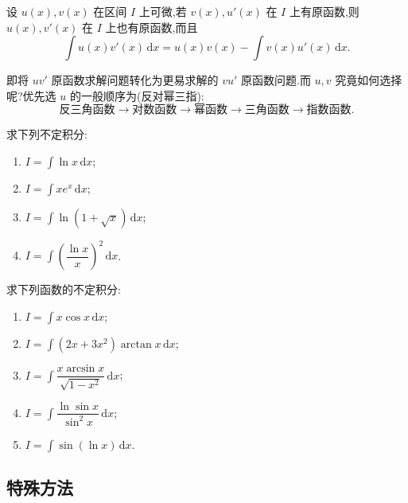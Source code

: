 \documentclass[../数学分析培优讲义.tex]{subfiles}
\begin{document}
\begin{theorem}
设 $u(x),v(x)$ 在区间 $I$ 上可微,若 $v(x),u'(x)$ 在 $I$ 上有原函数,则 $u(x),v'(x)$ 在 $I$ 上也有原函数,而且
\[
    \int u(x)v'(x)\,\mathrm{d}x
    =u(x)v(x)-\int v(x)u'(x)\,\mathrm{d}x.
\]
\end{theorem}

\begin{remark}
即将 $uv'$ 原函数求解问题转化为更易求解的 $vu'$ 原函数问题.而 $u,v$ 究竟如何选择呢?优先选 $u$ 的一般顺序为(反对幂三指):
\[
    \text{反三角函数}\longrightarrow\text{对数函数}\longrightarrow\text{幂函数}
    \longrightarrow\text{三角函数}\longrightarrow\text{指数函数}.
\]
\end{remark}

\begin{example}
求下列不定积分:
\begin{enumerate}[label=(\arabic*)]
    \item $\displaystyle I=\int\ln x\,\mathrm{d}x$;
    \item $\displaystyle I=\int xe^x\,\mathrm{d}x$;
    \item $\displaystyle I=\int\ln(1+\sqrt{x})\,\mathrm{d}x$;
    \item $\displaystyle I=\int\left(\dfrac{\ln x}{x}\right)^2\,\mathrm{d}x$.
\end{enumerate}
\end{example}
\exampleblank

\begin{example}
求下列函数的不定积分:
\begin{enumerate}[label=(\arabic*)]
    \item $\displaystyle I=\int x\cos x\,\mathrm{d}x$;
    \item $\displaystyle I=\int(2x+3x^2)\arctan x\,\mathrm{d}x$;
    \item $\displaystyle I=\int\dfrac{x\arcsin x}{\sqrt{1-x^2}}\,\mathrm{d}x$;
    \item $\displaystyle I=\int\dfrac{\ln\sin x}{\sin^2x}\,\mathrm{d}x$;
    \item $\displaystyle I=\int\sin(\ln x)\,\mathrm{d}x$.
\end{enumerate}
\end{example}
\exampleblank


\newpage

\subsection{特殊方法}
\end{document}
